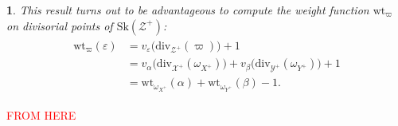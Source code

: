 \documentclass{amsart}%
\numberwithin{equation}{subsection}
\theoremstyle{plain2}
\theoremstyle{definition2}
\theoremstyle{stepstyle}
\theoremstyle{point}
\theoremstyle{subpoint}
\newtheorem{subpoint}[equation]{}%
\newcommand{\spa}[1]{\begin{subpoint}#1\end{subpoint}}           %
\newcommand{\R}{\ensuremath{\mathbb{R}}}
\newcommand{\cX}{\ensuremath{\mathscr{X}}}
\newcommand{\cY}{\ensuremath{\mathscr{Y}}}
\newcommand{\cZ}{\ensuremath{\mathscr{Z}}}
\renewcommand{\R}{\ensuremath{\mathbb{R}}}
\renewcommand{\cZ}{\ensuremath{\mathscr{Z}}}
\renewcommand{\cY}{\ensuremath{\mathscr{Y}}}
\newcommand{\divisor}{\mathrm{div}}
\newcommand{\weight}{\mathrm{wt}}
\newcommand{\Sk}{\mathrm{Sk}}
\begin{document}
{%
%
%
%
%
%
}
\spa{This result turns out to be advantageous to compute the weight function $\weight_\varpi$ on divisorial points of $\Sk(\cZ^+)$: 
\begin{align} \label{equ weight function product}
\begin{split}
\weight_\varpi(\varepsilon)
& = v_{\varepsilon}\big(\divisor_{\cZ^+}(\varpi)\big) +1 \\
& = v_{\alpha}\big(\divisor_{\cX^+}(\omega_{X^+})\big) + v_{\beta}\big(\divisor_{\cY^+}(\omega_{Y^+})\big) + 1 \\
& = \weight_{\omega_{X^+}}(\alpha) + \weight_{\omega_{Y^+}}(\beta) - 1.
\end{split}
\end{align}
}
\textcolor{red}{FROM HERE}
\end{document}
